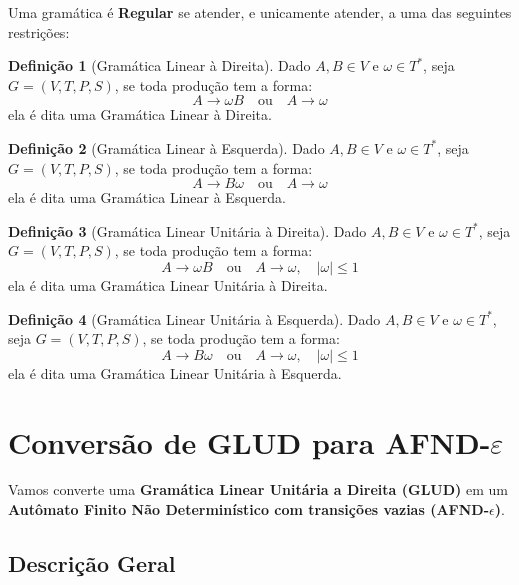 \documentclass[12pt, a4paper]{article}
\theoremstyle{definition}
\newtheorem{definition}{Definição}[section]
\theoremstyle{plain}
\theoremstyle{remark}
\begin{document}
Uma gramática é \textbf{Regular} se atender, e unicamente atender, a uma das seguintes restrições:

\begin{definition}[Gramática Linear à Direita]
Dado $A, B \in V$ e $\omega \in T^*$, seja $G = (V, T, P, S)$, se toda produção tem a forma:
\[
A \rightarrow \omega B \quad \text{ou} \quad A \rightarrow \omega
\]
ela é dita uma Gramática Linear à Direita. 
\end{definition}

\begin{definition}[Gramática Linear à Esquerda]
Dado $A, B \in V$ e $\omega \in T^*$, seja $G = (V, T, P, S)$, se toda produção tem a forma:
\[
A \rightarrow B \omega \quad \text{ou} \quad A \rightarrow \omega
\]
ela é dita uma Gramática Linear à Esquerda. 
\end{definition}


\begin{definition}[Gramática Linear Unitária à Direita]
Dado $A, B \in V$ e $\omega \in T^*$, seja $G = (V, T, P, S)$, se toda produção tem a forma:
\[
A \rightarrow \omega B \quad \text{ou} \quad A \rightarrow \omega, \quad |\omega| \le 1
\]
ela é dita uma Gramática Linear Unitária à Direita. 
\end{definition}

\begin{definition}[Gramática Linear Unitária à Esquerda]
Dado $A, B \in V$ e $\omega \in T^*$, seja $G = (V, T, P, S)$, se toda produção tem a forma:
\[
A \rightarrow B \omega \quad \text{ou} \quad A \rightarrow \omega, \quad |\omega| \le 1
\]
ela é dita uma Gramática Linear Unitária à Esquerda. 
\end{definition}

\section{Conversão de GLUD para AFND-$\varepsilon$}

Vamos converte uma \textbf{Gramática Linear Unitária a Direita (GLUD)} em um \textbf{Autômato Finito Não Determinístico com transições vazias (AFND-$\epsilon$)}.

\subsection{Descrição Geral}
\end{document}
